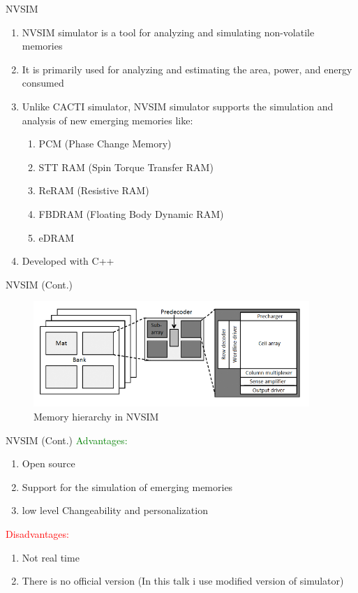 \documentclass{beamer}
\begin{document}
\begin{frame}{NVSIM}
	\begin{enumerate}
		\item NVSIM simulator is a tool for analyzing and simulating non-volatile memories
		\item It is primarily used for analyzing and estimating the area, power, and energy consumed
		\item Unlike CACTI simulator, NVSIM simulator supports the simulation and analysis of new emerging memories like:
		\begin{enumerate}
			\item PCM (Phase Change Memory)
			\item STT RAM (Spin Torque Transfer RAM)	
			\item ReRAM (Resistive RAM)
			\item FBDRAM (Floating Body Dynamic RAM)
			\item eDRAM	
		\end{enumerate}
		\item Developed with C++
	\end{enumerate}
\end{frame}


\begin{frame}{NVSIM (Cont.)}
	
	\begin{figure}
		\centering
		\includegraphics[height=4cm]{images/img10}
		\caption{Memory hierarchy in NVSIM}
		\label{fig:Memory hierarchy in NVSIM}
	\end{figure}

\end{frame}



\begin{frame}{NVSIM (Cont.)}
	\textcolor{green}{Advantages:}
	\begin{enumerate}
		\item Open source
		\item Support for the simulation of emerging memories
		\item low level Changeability and personalization
	\end{enumerate}
	
	\textcolor{red}{Disadvantages:}
	\begin{enumerate}
		\item Not real time
		\item There is no official version (In this talk i use modified version of simulator)
	\end{enumerate}
\end{frame}
\end{document}
